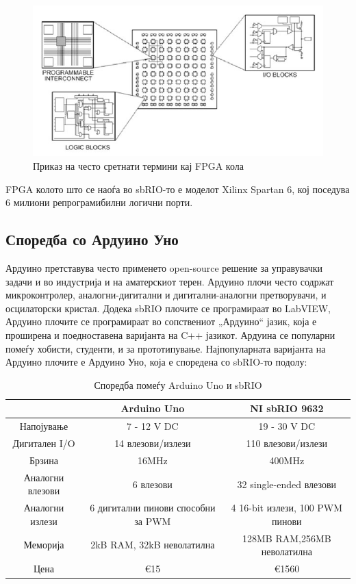 \documentclass{article}
\begin{document}
\begin{figure}[h]
\includegraphics[width=0.75\linewidth]{fpga_diagram.jpg}
\centering
\caption{Приказ на често сретнати термини кај FPGA кола}
\label{fig:fpga_diagram_jpg}
\end{figure}

FPGA колото што се наоѓа во sbRIO-то е моделот Xilinx Spartan 6, кој поседува 6 милиони репрограмибилни логични порти.
\subsection{Споредба со Ардуино Уно}
Ардуино претставува често применето open-source решение за управувачки задачи и во индустрија и на аматерскиот терен. Ардуино плочи често содржат микроконтролер, аналогни-дигитални и дигитални-аналогни претворувачи, и осцилаторски кристал. Додека sbRIO плочите се програмираат во LabVIEW, Ардуино плочите се програмираат во сопствениот „Ардуино“ јазик, која е проширена и поедноставена варијанта на C++ јазикот. Ардуина се популарни помеѓу хобисти, студенти, и за прототипување. Најпопуларната варијанта на Ардуино плочите е Ардуино Уно, која е споредена со sbRIO-то подолу:    
\begin{table}[h]
\caption{Споредба помеѓу Arduino Uno и sbRIO}
\label{tab:title}

\begin{center}
\begin{tabular}{||c|c|c||}
\hline
  & Arduino Uno & NI sbRIO 9632 \\ [0.75ex]
\hline \hline
Напојување & 7 - 12 V DC & 19 - 30 V DC \\
\hline 
Дигитален I/O & 14 влезови/излези & 110 влезови/излези \\
\hline
Брзина & 16MHz & 400MHz \\

\hline
Аналогни влезови & 6 влезови & 32 single-ended влезови \\
\hline
Аналогни излези & 6 дигитални пинови способни за PWM & 4 16-bit излези, 100 PWM пинови \\
\hline
Меморија & 2kB RAM, 32kB неволатилна & 128MB RAM,256MB неволатилна \\ 
\hline
Цена & €15 & €1560 \\ [0.5ex]
\hline
\end{tabular}
\end{center}
\end{table}
\newpage
\end{document}
